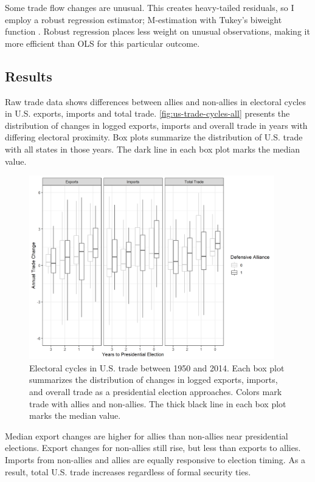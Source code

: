 \documentclass[12pt]{article}
\begin{document}
Some trade flow changes are unusual. 
This creates heavy-tailed residuals, so I employ a robust regression estimator; M-estimation with Tukey's biweight function \citep{RaineyBaissa2020}.
Robust regression places less weight on unusual observations, making it more efficient than OLS for this particular outcome.



\subsection{Results}


Raw trade data shows differences between allies and non-allies in electoral cycles in U.S. exports, imports and total trade. 
\autoref{fig:us-trade-cycles-all} presents the distribution of changes in logged exports, imports and overall trade in years with differing electoral proximity.
Box plots summarize the distribution of U.S. trade with all states in those years. 
The dark line in each box plot marks the median value. 



\begin{figure}
\centering
\includegraphics[width=0.95\textwidth]{../figures/us-trade-cycles-all.png}
\caption{Electoral cycles in U.S. trade between 1950 and 2014. Each box plot summarizes the distribution of changes in logged exports, imports, and overall trade as a presidential election approaches. Colors mark trade with allies and non-allies. The thick black line in each box plot marks the median value.}
\label{fig:us-trade-cycles-all}
\end{figure}


Median export changes are higher for allies than non-allies near presidential elections. 
Export changes for non-allies still rise, but less than exports to allies. 
Imports from non-allies and allies are equally responsive to election timing. 
As a result, total U.S. trade increases regardless of formal security ties.
\end{document}
